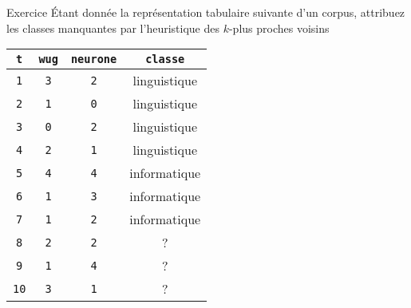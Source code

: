 \documentclass[xcolor={svgnames}, french]{beamer}
\title{\titlepagetitle}
\subtitle{\titlepagesubtitle}
\author{\textbf{\myname} (\mylab)}
\institute{}
\date{\tiny Version {\yyyymmdddate\today}T\currenttime}
\begin{document}

\begin{frame}[plain]
	\titlepage %
\end{frame}

\begin{frame}[fragile=singleslide]{Exercice}
	Étant donnée la représentation tabulaire suivante d'un corpus, attribuez les classes manquantes par l'heuristique des $k$-plus proches voisins
	\begin{table}
		\begin{tabu} to .9
			\texttt{t}  & \texttt{wug} & \texttt{neurone} & \texttt{classe}\\
			\hline
			\texttt{1}  & \texttt{3}      & \texttt{2}	& linguistique\\
			\texttt{2}  & \texttt{1}      & \texttt{0}	& linguistique\\
			\texttt{3}  & \texttt{0}      & \texttt{2}	& linguistique\\
			\texttt{4}  & \texttt{2}      & \texttt{1}	& linguistique\\
			\texttt{5}  & \texttt{4}      & \texttt{4}	& informatique\\
			\texttt{6}  & \texttt{1}      & \texttt{3}	& informatique\\
			\texttt{7}  & \texttt{1}      & \texttt{2}	& informatique\\
			\texttt{8}  & \texttt{2}      & \texttt{2}	& ?\\
			\texttt{9}  & \texttt{1}      & \texttt{4}	& ?\\
			\texttt{10}  & \texttt{3}      & \texttt{1}	& ?\\
		\end{tabu}
	\end{table}
\end{frame}
\end{document}
